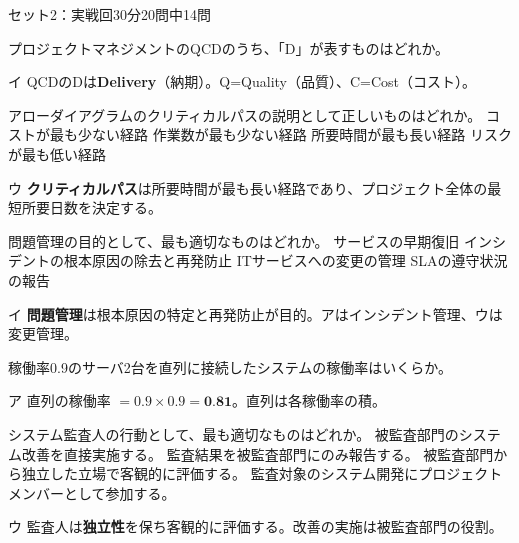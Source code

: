 \begin{mogishi}{セット2：実戦回}{30分}{20問中14問}
\begin{itpmon}[\diffbadge{標}]{プロジェクトマネジメントのQCDのうち、「D」が表すものはどれか。}
\end{itpmon}
\begin{kaisetsu}{イ}
QCDのDは\textbf{Delivery}（納期）。Q=Quality（品質）、C=Cost（コスト）。
\end{kaisetsu}

\begin{itpmon}[\diffbadge{標}]{アローダイアグラムのクリティカルパスの説明として正しいものはどれか。}
\sentakushi
  {コストが最も少ない経路}
  {作業数が最も少ない経路}
  {所要時間が最も長い経路}
  {リスクが最も低い経路}
\end{itpmon}
\begin{kaisetsu}{ウ}
\textbf{クリティカルパス}は所要時間が最も長い経路であり、プロジェクト全体の最短所要日数を決定する。
\end{kaisetsu}

\begin{itpmon}[\diffbadge{標}]{問題管理の目的として、最も適切なものはどれか。}
\sentakushi
  {サービスの早期復旧}
  {インシデントの根本原因の除去と再発防止}
  {ITサービスへの変更の管理}
  {SLAの遵守状況の報告}
\end{itpmon}
\begin{kaisetsu}{イ}
\textbf{問題管理}は根本原因の特定と再発防止が目的。アはインシデント管理、ウは変更管理。
\end{kaisetsu}

\begin{itpmon}[\diffbadge{強}]{稼働率0.9のサーバ2台を直列に接続したシステムの稼働率はいくらか。}
\end{itpmon}
\begin{kaisetsu}{ア}
直列の稼働率 $= 0.9 \times 0.9 = \textbf{0.81}$。直列は各稼働率の積。
\end{kaisetsu}

\begin{itpmon}[\diffbadge{標}]{システム監査人の行動として、最も適切なものはどれか。}
\sentakushi
  {被監査部門のシステム改善を直接実施する。}
  {監査結果を被監査部門にのみ報告する。}
  {被監査部門から独立した立場で客観的に評価する。}
  {監査対象のシステム開発にプロジェクトメンバーとして参加する。}
\end{itpmon}
\begin{kaisetsu}{ウ}
監査人は\textbf{独立性}を保ち客観的に評価する。改善の実施は被監査部門の役割。
\end{kaisetsu}


\end{mogishi}

